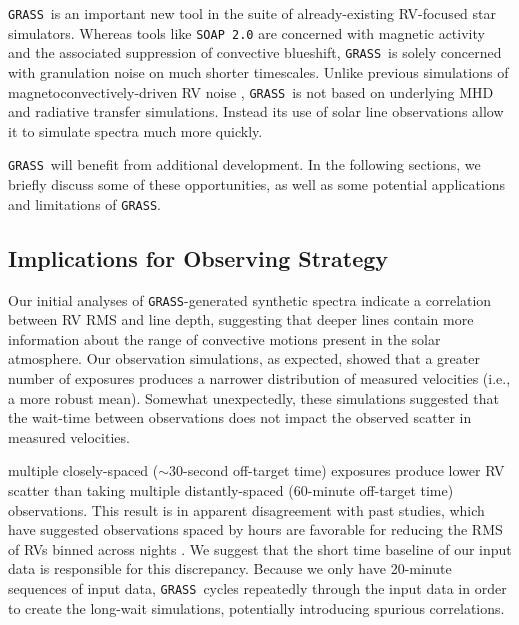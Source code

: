 \documentclass[twocolumn]{aastex63}
\newcommand{\grass}{\texttt{GRASS}}
\newcommand{\revise}[1]{#1}
\newcommand{\revisetwo}[1]{#1}
\begin{document}
\grass\ is an important new tool in the suite of already-existing RV-focused star simulators. Whereas tools like \texttt{SOAP 2.0} \citep{Dumusque2014} are concerned with magnetic activity and the associated suppression of convective blueshift, \grass\ is solely concerned with granulation noise on much shorter timescales. Unlike previous simulations of magnetoconvectively-driven RV noise \citep[e.g.,][]{Cegla2019a}, \grass\ is not based on underlying MHD and radiative transfer simulations. Instead its use of solar line observations allow it to simulate spectra much more quickly. \par

\grass\ will benefit from additional development. In the following sections, we briefly discuss some of these opportunities, as well as some potential applications and limitations of \grass.  \par 

\subsection{Implications for Observing Strategy} 
Our initial analyses of \grass-generated synthetic spectra indicate a correlation between RV RMS and line depth, suggesting that deeper lines contain more information about the range of convective motions present in the solar atmosphere. Our observation simulations, as expected, showed that a greater number of exposures produces a narrower distribution of measured velocities (i.e., a more robust mean). Somewhat unexpectedly, these simulations suggested that \revisetwo{the wait-time between observations does not impact the observed scatter in measured velocities.} 

{multiple closely-spaced ($\sim$30-second off-target time) exposures produce lower RV scatter than taking multiple distantly-spaced (\revise{60}-minute off-target time) observations.} \revise{This result is in apparent disagreement with past studies, which have suggested observations spaced by hours are favorable} \revisetwo{for reducing the RMS of RVs binned across nights} \revise{\citep[e.g.,][]{Dumusque2011, Meunier2015, CollierCameron2019}.} \revise{We suggest that the short time baseline of our input data is responsible for this discrepancy. Because we only have 20-minute sequences of input data, \grass\ cycles repeatedly through the input data in order to create the long-wait simulations, potentially introducing spurious correlations.} \par 
\end{document}
